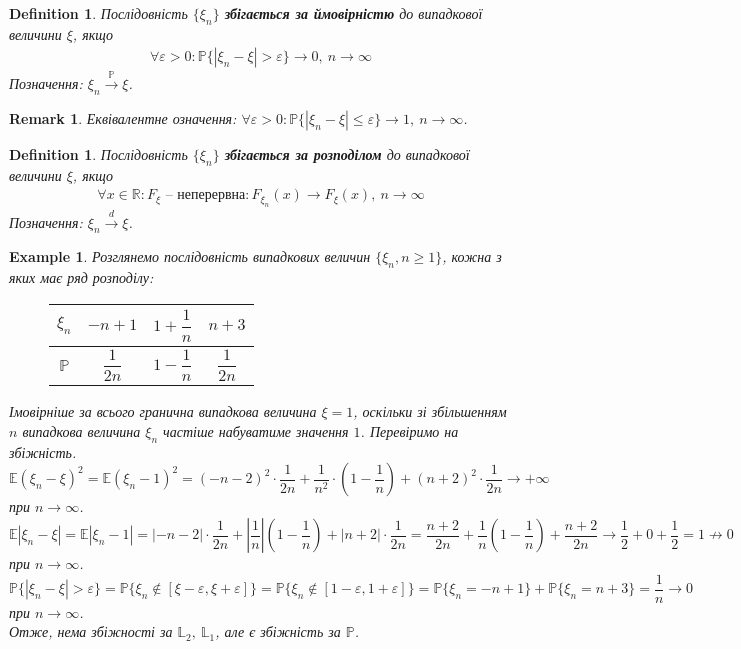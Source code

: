 \documentclass[a4paper, 10pt]{article}
\theoremstyle{theoremdd}
\newtheorem{definition}[theorem]{Definition}
\newtheorem{example}[theorem]{Example}
\newtheorem{remark}[theorem]{Remark}
\newcommand{\toprobability}{\overset{\mathbb{P}}{\to}}
\newcommand{\todistribution}{\overset{d}{\to}}
\begin{document}
\begin{definition}
Послідовність $\{\xi_n\}$ \textbf{збігається за ймовірністю} до випадкової величини $\xi$, якщо
\begin{align*}
\forall \varepsilon > 0: \mathbb{P}\{ |\xi_n - \xi| > \varepsilon \} \to 0,\ n \to \infty
\end{align*}
Позначення: $\xi_n \toprobability \xi$.
\end{definition}

\begin{remark}
Еквівалентне означення: $\forall \varepsilon > 0: \mathbb{P}\{ |\xi_n - \xi| \leq \varepsilon \} \to 1,\ n \to \infty$.
\end{remark}

\begin{definition}
Послідовність $\{\xi_n\}$ \textbf{збігається за розподілом} до випадкової величини $\xi$, якщо
\begin{align*}
\forall x \in \mathbb{R}: F_{\xi} \text{ -- неперервна}:  F_{\xi_n}(x) \to F_\xi(x),\ n \to \infty
\end{align*}
Позначення: $\xi_n \todistribution \xi$.
\end{definition}

\begin{example}
Розглянемо послідовність випадкових величин $\{\xi_n, n \geq 1\}$, кожна з яких має ряд розподілу:
\begin{figure}[H]
\centering
\begin{tabular}{c|c|c|c}
$\xi_n$ & $-n+1$ & $1+\dfrac{1}{n}$ & $n+3$ \\
\hline
$\mathbb{P}$ & $\dfrac{1}{2n}$ & $1-\dfrac{1}{n}$ & $\dfrac{1}{2n}$
\end{tabular}
\end{figure}
\noindent
Імовірніше за всього гранична випадкова величина $\xi = 1$, оскільки зі збільшенням $n$ випадкова величина $\xi_n$ частіше набуватиме значення $1$. Перевіримо на збіжність.\\
$\mathbb{E}(\xi_n-\xi)^2 = \mathbb{E}(\xi_n-1)^2 = (-n-2)^2 \cdot \dfrac{1}{2n} + \dfrac{1}{n^2} \cdot \left( 1 - \dfrac{1}{n} \right) + (n+2)^2 \cdot \dfrac{1}{2n} \to +\infty$ при $n \to \infty$.\\
$\mathbb{E}|\xi_n-\xi| = \mathbb{E}|\xi_n - 1| = |-n-2| \cdot \dfrac{1}{2n} + \left|\dfrac{1}{n}\right| \left(1 - \dfrac{1}{n}\right) + |n+2| \cdot \dfrac{1}{2n} = \dfrac{n+2}{2n} + \dfrac{1}{n} \left(1 - \dfrac{1}{n}\right) + \dfrac{n+2}{2n} \to \dfrac{1}{2}+0+\dfrac{1}{2} = 1 \not\to 0$ при $n \to \infty$.\\
$\mathbb{P}\{ |\xi_n-\xi| > \varepsilon \} = \mathbb{P}\{ \xi_n \notin [\xi-\varepsilon,\xi+\varepsilon] \} = \mathbb{P}\{ \xi_n \notin [1-\varepsilon,1+\varepsilon] \} = \mathbb{P}\{\xi_n = -n+1\} + \mathbb{P}\{\xi_n = n+3\} = \dfrac{1}{n} \to 0$ при $n \to \infty$.
\bigskip \\
Отже, нема збіжності за $\mathbb{L}_2,\ \mathbb{L}_1$, але є збіжність за $\mathbb{P}$.
\end{example}
\end{document}
